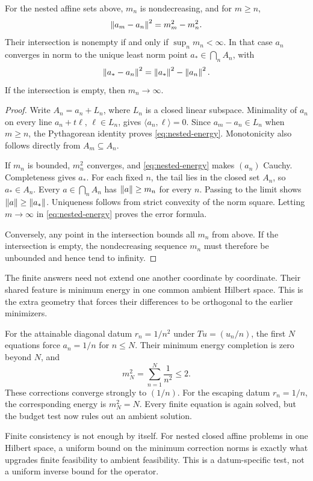 \begin{theorem}\label{WR02}
For the nested affine sets above, $m_n$ is nondecreasing, and for $m\ge n$,
\begin{equation}\label{eq:nested-energy}
 \left\lVert a_m-a_n\right\rVert^2=m_m^2-m_n^2.
\end{equation}
Their intersection is nonempty if and only if $\sup_n m_n<\infty$. In that case $a_n$ converges in norm to the unique least norm point $a_*\in\bigcap_n A_n$, with
\[
 \left\lVert a_*-a_n\right\rVert^2=\left\lVert a_*\right\rVert^2-\left\lVert a_n\right\rVert^2.
\]
If the intersection is empty, then $m_n\to\infty$.
\end{theorem}
\begin{proof}
Write $A_n=a_n+L_n$, where $L_n$ is a closed linear subspace. Minimality of $a_n$ on every line $a_n+t\ell$, $\ell\in L_n$, gives $\langle a_n,\ell\rangle=0$. Since $a_m-a_n\in L_n$ when $m\ge n$, the Pythagorean identity proves \eqref{eq:nested-energy}. Monotonicity also follows directly from $A_m\subseteq A_n$.

If $m_n$ is bounded, $m_n^2$ converges, and \eqref{eq:nested-energy} makes $(a_n)$ Cauchy. Completeness gives $a_*$. For each fixed $n$, the tail lies in the closed set $A_n$, so $a_*\in A_n$. Every $a\in\bigcap_n A_n$ has $\left\lVert a\right\rVert\ge m_n$ for every $n$. Passing to the limit shows $\left\lVert a\right\rVert\ge\left\lVert a_*\right\rVert$. Uniqueness follows from strict convexity of the norm square. Letting $m\to\infty$ in \eqref{eq:nested-energy} proves the error formula.

Conversely, any point in the intersection bounds all $m_n$ from above. If the intersection is empty, the nondecreasing sequence $m_n$ must therefore be unbounded and hence tend to infinity.
\end{proof}

The finite answers need not extend one another coordinate by coordinate. Their shared feature is minimum energy in one common ambient Hilbert space. This is the extra geometry that forces their differences to be orthogonal to the earlier minimizers.

For the attainable diagonal datum $r_n=1/n^2$ under $Tu=(u_n/n)$, the first $N$ equations force $a_n=1/n$ for $n\le N$. Their minimum energy completion is zero beyond $N$, and
\[
 m_N^2=\sum_{n=1}^{N}\frac1{n^2}\le2.
\]
These corrections converge strongly to $(1/n)$. For the escaping datum $r_n=1/n$, the corresponding energy is $m_N^2=N$. Every finite equation is again solved, but the budget test now rules out an ambient solution.


\begin{insight}
Finite consistency is not enough by itself. For nested closed affine problems in one Hilbert space, a uniform bound on the minimum correction norms is exactly what upgrades finite feasibility to ambient feasibility. This is a datum-specific test, not a uniform inverse bound for the operator.
\end{insight}
